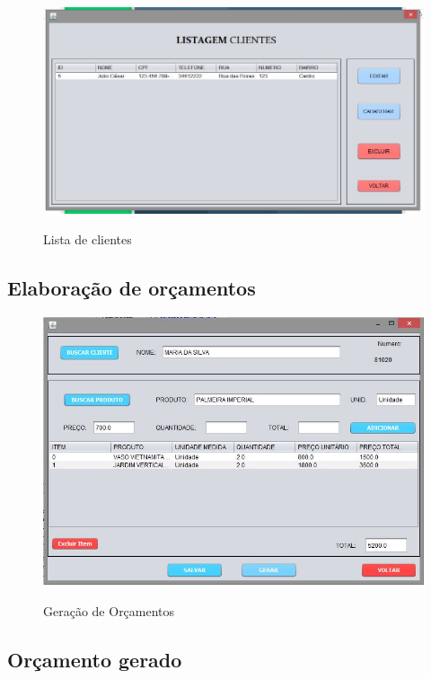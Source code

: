  \begin{figure}[H]
\centering
\caption{Lista de clientes}
\includegraphics[width=15cm]{imagens/telas/ListaCliente}
\label{fig:Lista de clientes}
\end{figure}
        
\subsection{Elaboração de orçamentos}
\begin{figure}[H]
\centering
\caption{Geração de Orçamentos}
\includegraphics[width=14cm]{imagens/telas/GeraOrcamento}
\label{fig:Geração de orçamento}
\end{figure}      

\subsection{Orçamento gerado}

